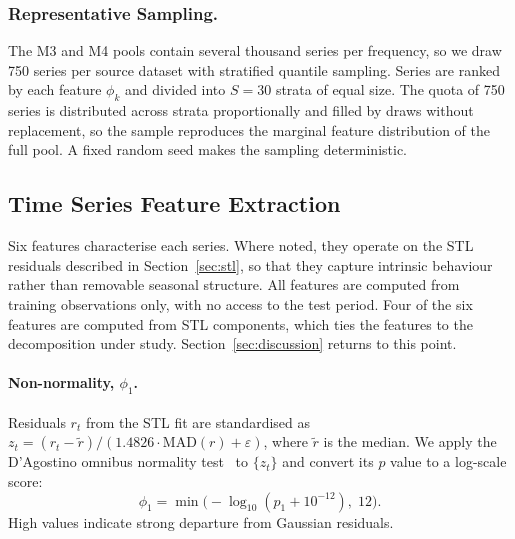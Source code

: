 \documentclass[pdflatex,sn-mathphys-num]{sn-jnl}
\theoremstyle{thmstyleone}
\theoremstyle{thmstyletwo}
\theoremstyle{thmstylethree}
\begin{document}
\subsubsection{Representative Sampling.}\label{sec:sampling}

The M3 and M4 pools contain several thousand series per frequency, so we draw
750 series per source dataset with stratified quantile sampling. Series are
ranked by each feature $\phi_k$ and divided into $S = 30$ strata of equal
size. The quota of 750 series is distributed across strata proportionally and
filled by draws without replacement, so the sample reproduces the marginal
feature distribution of the full pool. A fixed random seed makes the sampling
deterministic.

\subsection{Time Series Feature Extraction}\label{sec:features}

Six features characterise each series. Where noted, they operate on the STL
residuals described in Section~\ref{sec:stl}, so that they capture intrinsic
behaviour rather than removable seasonal structure. All features are computed
from training observations only, with no access to the test period. Four of
the six features are computed from STL components, which ties the features to
the decomposition under study. Section~\ref{sec:discussion} returns to this
point.

\paragraph{Non-normality, $\phi_1$.}
Residuals $r_t$ from the STL fit are standardised as
$z_t = (r_t - \tilde{r}) / (1.4826 \cdot \mathrm{MAD}(r) + \varepsilon)$,
where $\tilde{r}$ is the median. We apply the D'Agostino omnibus normality
test~\cite{dagostino1971} to $\{z_t\}$ and convert its $p$ value to a
log-scale score:
\begin{equation}
  \phi_1 = \min\!\bigl(-\log_{10}(p_1 + 10^{-12}),\; 12\bigr).
  \label{eq:phi1}
\end{equation}
High values indicate strong departure from Gaussian residuals.
\end{document}
